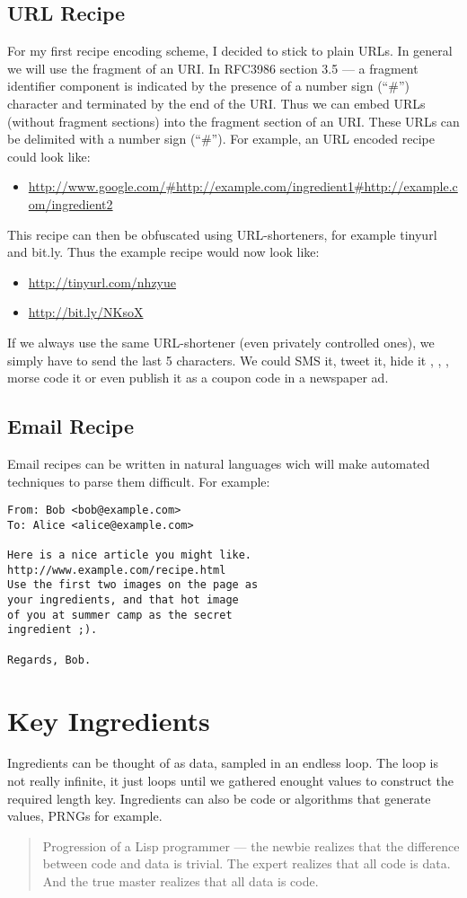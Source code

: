 \documentclass[10pt,conference,a4article]{IEEEtran}
\begin{document}
\subsection{URL Recipe}
For my first recipe encoding scheme, I decided to stick to plain URLs. In 
general we will use the fragment of an URI. In RFC3986 section 3.5 \cite{RFC3986}
--- a fragment identifier component is indicated by the presence of a number
sign (``\#'') character and terminated by the end of the URI. Thus we can embed
URLs (without fragment sections) into the fragment section of an URI.
These URLs can be delimited with a number sign (``\#''). For example, an URL 
encoded recipe could look like:
\begin{itemize}
\item{\url{http://www.google.com/#http://example.com/ingredient1#http://example.com/ingredient2}}
\end{itemize}
This recipe can then be obfuscated using URL-shorteners, for example tinyurl
and bit.ly. Thus the example recipe would now look like:
\begin{itemize}
\item{\url{http://tinyurl.com/nhzyue}}
\item{\url{http://bit.ly/NKsoX}}
\end{itemize}
If we always use the same URL-shortener (even privately controlled ones), we simply
have to send the last 5 characters. We could SMS it, tweet it, hide it \cite{DeCSS},
\cite{Steganography}, \cite{SpreadSpectrum}, morse code it or even publish it as a 
coupon code in a newspaper ad.

\subsection{Email Recipe}
Email recipes can be written in natural languages wich will make automated techniques
to parse them difficult. For example:
\begin{verbatim}
From: Bob <bob@example.com>
To: Alice <alice@example.com>

Here is a nice article you might like.
http://www.example.com/recipe.html
Use the first two images on the page as
your ingredients, and that hot image
of you at summer camp as the secret
ingredient ;).

Regards, Bob.
\end{verbatim}

\section{Key Ingredients}
Ingredients can be thought of as data, sampled in an endless loop. The loop is not 
really infinite, it just loops until we gathered enought values to construct the
required length key. Ingredients can also be code or algorithms that generate 
values, PRNGs \cite{PRNG} for example.\\[0.25ex]
\begin{quote}
Progression of a Lisp programmer --- the newbie realizes that the difference between
code and data is trivial. The expert realizes that all code is data. And the true
master realizes that all data is code.
\end{quote}
\end{document}

